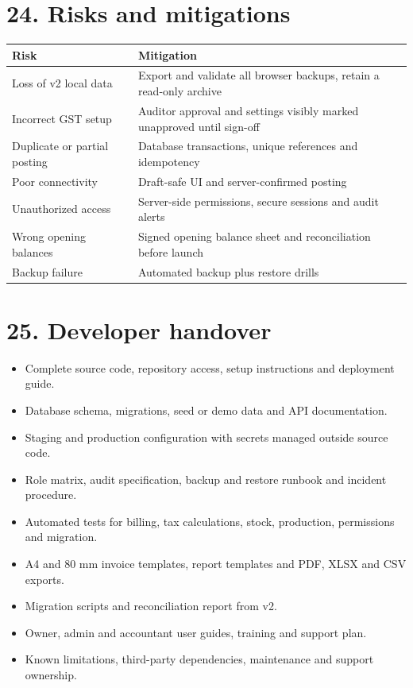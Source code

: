 \documentclass[11pt]{article}
\begin{document}
\section{24. Risks and mitigations}
\begin{center}\small\begin{tabularx}{\linewidth}{|*{2}{>{\raggedright\arraybackslash}X|}}
\hline
\textbf{Risk} & \textbf{Mitigation} \\
\hline
Loss of v2 local data & Export and validate all browser backups, retain a read-only archive \\
\hline
Incorrect GST setup & Auditor approval and settings visibly marked unapproved until sign-off \\
\hline
Duplicate or partial posting & Database transactions, unique references and idempotency \\
\hline
Poor connectivity & Draft-safe UI and server-confirmed posting \\
\hline
Unauthorized access & Server-side permissions, secure sessions and audit alerts \\
\hline
Wrong opening balances & Signed opening balance sheet and reconciliation before launch \\
\hline
Backup failure & Automated backup plus restore drills \\
\hline
\end{tabularx}\end{center}
\clearpage
\section{25. Developer handover}
\begin{itemize}[leftmargin=*,itemsep=2pt,topsep=2pt]
\item Complete source code, repository access, setup instructions and deployment guide.
\item Database schema, migrations, seed or demo data and API documentation.
\item Staging and production configuration with secrets managed outside source code.
\item Role matrix, audit specification, backup and restore runbook and incident procedure.
\item Automated tests for billing, tax calculations, stock, production, permissions and migration.
\item A4 and 80 mm invoice templates, report templates and PDF, XLSX and CSV exports.
\item Migration scripts and reconciliation report from v2.
\item Owner, admin and accountant user guides, training and support plan.
\item Known limitations, third-party dependencies, maintenance and support ownership.
\end{itemize}
\clearpage
\end{document}
